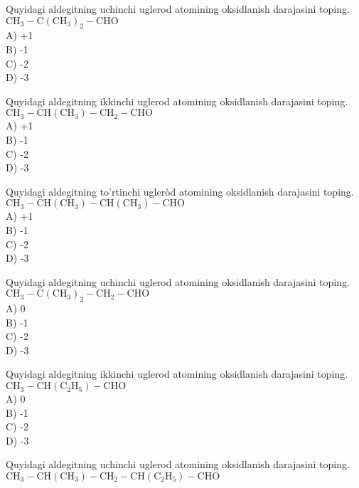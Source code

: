   \item Quyidagi aldegitning uchinchi uglerod atomining oksidlanish darajasini toping.\\
$\mathrm{CH}_{3}-\mathrm{C}\left(\mathrm{CH}_{3}\right)_{2}-\mathrm{CHO}$\\
A) +1\\
B) -1\\
C) -2\\
D) -3
  \item Quyidagi aldegitning ikkinchi uglerod atomining oksidlanish darajasini toping.\\
$\mathrm{CH}_{3}-\mathrm{CH}\left(\mathrm{CH}_{3}\right)-\mathrm{CH}_{2}-\mathrm{CHO}$\\
A) +1\\
B) -1\\
C) -2\\
D) -3
  \item Quyidagi aldegitning to'rtinchi ugleròd atomining oksidlanish darajasini toping.\\
$\mathrm{CH}_{3}-\mathrm{CH}\left(\mathrm{CH}_{3}\right)-\mathrm{CH}\left(\mathrm{CH}_{3}\right)-\mathrm{CHO}$\\
A) +1\\
B) -1\\
C) -2\\
D) -3
  \item Quyidagi aldegitning uchinchi uglerod atomining oksidlanish darajasini toping.\\
$\mathrm{CH}_{3}-\mathrm{C}\left(\mathrm{CH}_{3}\right)_{2}-\mathrm{CH}_{2}-\mathrm{CHO}$\\
A) 0\\
B) -1\\
C) -2\\
D) -3
  \item Quyidagi aldegitning ikkinchi uglerod atomining oksidlanish darajasini toping.\\
$\mathrm{CH}_{3}-\mathrm{CH}\left(\mathrm{C}_{2} \mathrm{H}_{5}\right)-\mathrm{CHO}$\\
A) 0\\
B) -1\\
C) -2\\
D) -3
  \item Quyidagi aldegitning uchinchi uglerod atomining oksidlanish darajasini toping.\\
$\mathrm{CH}_{3}-\mathrm{CH}\left(\mathrm{CH}_{3}\right)-\mathrm{CH}_{2}-\mathrm{CH}\left(\mathrm{C}_{2} \mathrm{H}_{5}\right)-\mathrm{CHO}$\\
